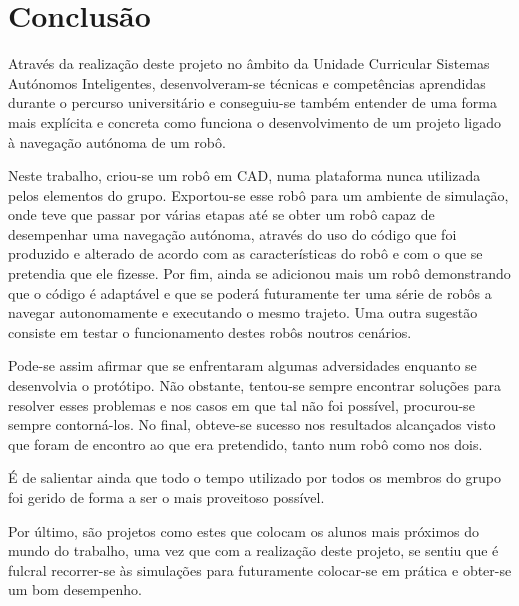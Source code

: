 \chapter{Conclusão}
\label{ch:conc}

Através da realização deste projeto no âmbito da Unidade Curricular Sistemas Autónomos Inteligentes, desenvolveram-se técnicas e competências aprendidas durante o percurso universitário e conseguiu-se também entender de uma forma mais explícita e concreta como funciona o desenvolvimento de um projeto ligado à navegação autónoma de um robô.

Neste trabalho, criou-se um robô em CAD, numa plataforma nunca utilizada pelos elementos do grupo. Exportou-se esse robô para um ambiente de simulação, onde teve que passar por várias etapas até se obter um robô capaz de desempenhar uma navegação autónoma, através do uso do código que foi produzido e alterado de acordo com as características do robô e com o que se pretendia que ele fizesse. Por fim, ainda se adicionou mais um robô demonstrando que o código é adaptável e que se poderá futuramente ter uma série de robôs a navegar autonomamente e executando o mesmo trajeto. Uma outra sugestão consiste em testar o funcionamento destes robôs noutros cenários.

Pode-se assim afirmar que se enfrentaram algumas adversidades enquanto se desenvolvia o protótipo. Não obstante, tentou-se sempre encontrar soluções para resolver esses problemas e nos casos em que tal não foi possível, procurou-se sempre contorná-los. No final, obteve-se sucesso nos resultados alcançados visto que foram de encontro ao que era pretendido, tanto num robô como nos dois.

É de salientar ainda que todo o tempo utilizado por todos os membros do grupo foi gerido de forma a ser o mais proveitoso possível. 

Por último, são projetos como estes que colocam os alunos mais próximos do mundo do trabalho, uma vez que com a realização deste projeto, se sentiu que é fulcral recorrer-se às simulações para futuramente colocar-se em prática e obter-se um bom desempenho.
